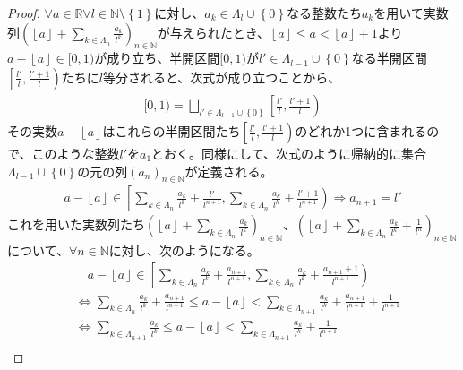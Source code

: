 \documentclass[dvipdfmx]{jsarticle}
\begin{document}
\begin{proof}
$\forall a \in \mathbb{R}\forall l \in \mathbb{N} \setminus \left\{ 1 \right\}$に対し、$a_{k} \in \varLambda_{l} \cup \left\{ 0 \right\}$なる整数たち$a_{k}$を用いて実数列$\left( \left\lfloor a \right\rfloor + \sum_{k \in \varLambda_{n}} \frac{a_{k}}{l^{k}} \right)_{n \in \mathbb{N}}$が与えられたとき、$\left\lfloor a \right\rfloor \leq a < \left\lfloor a \right\rfloor + 1$より$a - \left\lfloor a \right\rfloor \in [ 0,1)$が成り立ち、半開区間$[ 0,1)$が$l' \in \varLambda_{l - 1} \cup \left\{ 0 \right\}$なる半開区間$\left[ \frac{l'}{l},\frac{l' + 1}{l} \right)$たちに$l$等分されると、次式が成り立つことから、
\begin{align*}
[ 0,1) = \bigsqcup_{l' \in \varLambda_{l - 1} \cup \left\{ 0 \right\}} \left[ \frac{l'}{l},\frac{l' + 1}{l} \right)
\end{align*}
その実数$a - \left\lfloor a \right\rfloor$はこれらの半開区間たち$\left[ \frac{l'}{l},\frac{l' + 1}{l} \right)$のどれか1つに含まれるので、このような整数$l'$を$a_{1}$とおく。同様にして、次式のように帰納的に集合$\varLambda_{l - 1} \cup \left\{ 0 \right\}$の元の列$\left( a_{n} \right)_{n \in \mathbb{N}}$が定義される。
\begin{align*}
a - \left\lfloor a \right\rfloor \in \left[ \sum_{k \in \varLambda_{n}} \frac{a_{k}}{l^{k}} + \frac{l'}{l^{n + 1}},\sum_{k \in \varLambda_{n}} \frac{a_{k}}{l^{k}} + \frac{l' + 1}{l^{n + 1}} \right) \Rightarrow a_{n + 1} = l'
\end{align*}
これを用いた実数列たち$\left( \left\lfloor a \right\rfloor + \sum_{k \in \varLambda_{n}} \frac{a_{k}}{l^{k}} \right)_{n \in \mathbb{N}}$、$\left( \left\lfloor a \right\rfloor + \sum_{k \in \varLambda_{n}} \frac{a_{k}}{l^{k}} + \frac{1}{l^{n}} \right)_{n \in \mathbb{N}}$について、$\forall n \in \mathbb{N}$に対し、次のようになる。
\begin{align*}
&\quad a - \left\lfloor a \right\rfloor \in \left[ \sum_{k \in \varLambda_{n}} \frac{a_{k}}{l^{k}} + \frac{a_{n + 1}}{l^{n + 1}},\sum_{k \in \varLambda_{n}} \frac{a_{k}}{l^{k}} + \frac{a_{n + 1} + 1}{l^{n + 1}} \right)\\
&\Leftrightarrow \sum_{k \in \varLambda_{n}} \frac{a_{k}}{l^{k}} + \frac{a_{n + 1}}{l^{n + 1}} \leq a - \left\lfloor a \right\rfloor < \sum_{k \in \varLambda_{n + 1}} \frac{a_{k}}{l^{k}} + \frac{a_{n + 1}}{l^{n + 1}} + \frac{1}{l^{n + 1}}\\
&\Leftrightarrow \sum_{k \in \varLambda_{n + 1}} \frac{a_{k}}{l^{k}} \leq a - \left\lfloor a \right\rfloor < \sum_{k \in \varLambda_{n + 1}} \frac{a_{k}}{l^{k}} + \frac{1}{l^{n + 1}}\\

\end{align*}
\end{proof}
\end{document}
